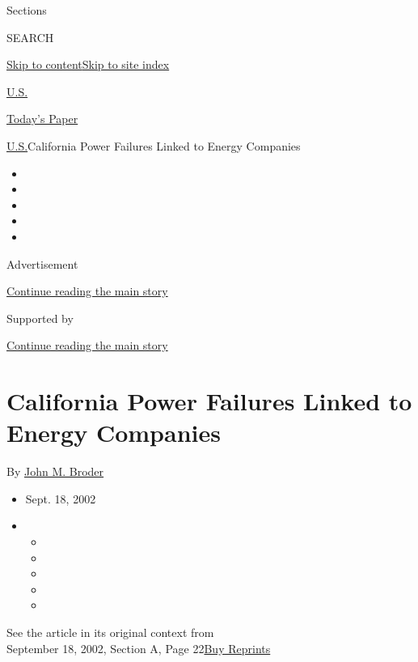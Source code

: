 Sections

SEARCH

\protect\hyperlink{site-content}{Skip to
content}\protect\hyperlink{site-index}{Skip to site index}

\href{https://www.nytimes3xbfgragh.onion/section/us}{U.S.}

\href{https://myaccount.nytimes3xbfgragh.onion/auth/login?response_type=cookie\&client_id=vi}{}

\href{https://www.nytimes3xbfgragh.onion/section/todayspaper}{Today's
Paper}

\href{/section/us}{U.S.}\textbar{}California Power Failures Linked to
Energy Companies

\begin{itemize}
\item
\item
\item
\item
\item
\end{itemize}

Advertisement

\protect\hyperlink{after-top}{Continue reading the main story}

Supported by

\protect\hyperlink{after-sponsor}{Continue reading the main story}

\hypertarget{california-power-failures-linked-to-energy-companies}{%
\section{California Power Failures Linked to Energy
Companies}\label{california-power-failures-linked-to-energy-companies}}

By \href{https://www.nytimes3xbfgragh.onion/by/john-m-broder}{John M.
Broder}

\begin{itemize}
\item
  Sept. 18, 2002
\item
  \begin{itemize}
  \item
  \item
  \item
  \item
  \item
  \end{itemize}
\end{itemize}

See the article in its original context from\\
September 18, 2002, Section A, Page
22\href{https://store.nytimes3xbfgragh.onion/collections/new-york-times-page-reprints?utm_source=nytimes\&utm_medium=article-page\&utm_campaign=reprints}{Buy
Reprints}


